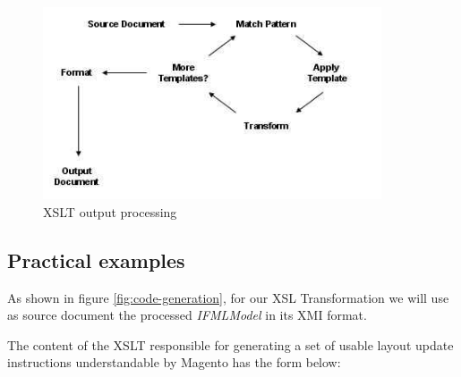  
\vspace{0.5cm}
\begin{figure}[H]
  \centering
    \includegraphics[width=10cm]{images/xslt-processing.jpg}
  \caption{XSLT output processing}
  \label{fig:xslt-processing}
\end{figure}
\vspace{0.5cm}


\subsection{Practical examples}

As shown in figure \ref{fig:code-generation}, for our XSL Transformation we will use as source document the processed \textit{IFMLModel} in its XMI format.

The content of the XSLT responsible for generating a set of usable layout update instructions understandable by Magento has the form below:

